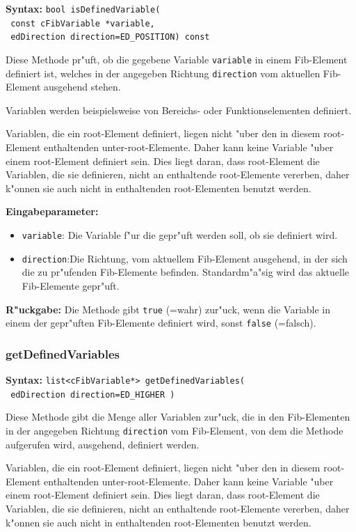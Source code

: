 \textbf{Syntax:} \verb|bool isDefinedVariable(| \\\verb| const cFibVariable *variable,| \\\verb| edDirection direction=ED_POSITION) const|

\bigskip\noindent
Diese Methode pr"uft, ob die gegebene Variable \verb|variable| in einem Fib-Element definiert ist, welches in der angegeben Richtung \verb|direction| vom aktuellen Fib-Element ausgehend stehen.

Variablen werden beispielsweise von Bereichs- oder Funktionselementen definiert.

Variablen, die ein root-Element definiert, liegen nicht "uber den in diesem root-Element enthaltenden unter-root-Elemente. Daher kann keine Variable "uber einem root-Element definiert sein. Dies liegt daran, dass root-Element die Variablen, die sie definieren, nicht an enthaltende root-Elemente vererben, daher k"onnen sie auch nicht in enthaltenden root-Elementen benutzt werden.

\bigskip\noindent
\textbf{Eingabeparameter:} 
\begin{itemize}
 \item \verb|variable|: Die Variable f"ur die gepr"uft werden soll, ob sie definiert wird.
 \item \verb|direction|:Die Richtung, vom aktuellem Fib-Element ausgehend, in der sich die zu pr"ufenden Fib-Elemente befinden. Standardm"a"sig wird das aktuelle Fib-Elemente gepr"uft.
\end{itemize}

\bigskip\noindent
\textbf{R"uckgabe:} Die Methode gibt \verb|true| (=wahr) zur"uck, wenn die Variable in einem der gepr"uften Fib-Elemente definiert wird, sonst \verb|false| (=falsch).


\subsubsection{getDefinedVariables}

\textbf{Syntax:} \verb|list<cFibVariable*> getDefinedVariables(| \\\verb| edDirection direction=ED_HIGHER )|

\bigskip\noindent
Diese Methode gibt die Menge aller Variablen zur"uck, die in den Fib-Elementen in der angegeben Richtung \verb|direction| vom Fib-Element, von dem die Methode aufgerufen wird, ausgehend, definiert werden.

Variablen, die ein root-Element definiert, liegen nicht "uber den in diesem root-Element enthaltenden unter-root-Elemente. Daher kann keine Variable "uber einem root-Element definiert sein. Dies liegt daran, dass root-Element die Variablen, die sie definieren, nicht an enthaltende root-Elemente vererben, daher k"onnen sie auch nicht in enthaltenden root-Elementen benutzt werden.

